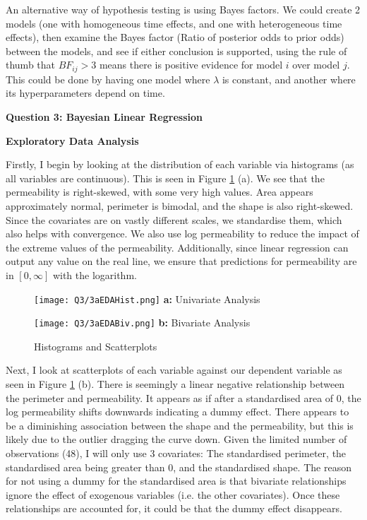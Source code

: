 \documentclass{article}
\begin{document}
An alternative way of hypothesis testing is using Bayes factors. We could create 2 models (one with homogeneous time effects, and one with heterogeneous time effects), then examine the Bayes factor (Ratio of posterior odds to prior odds) between the models, and see if either conclusion is supported, using the rule of thumb that $BF_{ij} > 3$ means there is positive evidence for model $i$ over model $j$.  This could be done by having one model where $\lambda$ is constant, and another where its hyperparameters depend on time. 

\newpage

\textbf{Question 3: Bayesian Linear Regression} \label{sec:3}

\textbf{Exploratory Data Analysis} \label{sec:3a}

Firstly, I begin by looking at the distribution of each variable via histograms (as all variables are continuous). This is seen in Figure \ref{Fig3a} (a). We see that the permeability is right-skewed, with some very high values. Area appears approximately normal, perimeter is bimodal, and the shape is also right-skewed. Since the covariates are on vastly different scales, we standardise them, which also helps with convergence. We also use log permeability to reduce the impact of the extreme values of the permeability. Additionally, since linear regression can output any value on the real line, we ensure that predictions for permeability are in $[0, \infty]$ with the logarithm. 

\begin{figure}[!h] 
    \begin{minipage}[l]{0.5\textwidth}
    \centering
    \texttt{[image: Q3/3aEDAHist.png]} 
    \scriptsize \textbf{a:} Univariate Analysis
    \end{minipage}
    \begin{minipage}[l]{0.5\textwidth}
    \centering
    \texttt{[image: Q3/3aEDABiv.png]}
    \scriptsize \textbf{b:} Bivariate Analysis
    \end{minipage}
\caption{Histograms and Scatterplots} \label{Fig3a}
\end{figure}


Next, I look at scatterplots of each variable against our dependent variable as seen in  Figure \ref{Fig3a} (b). There is seemingly a linear negative relationship between the perimeter and permeability. It appears as if after a standardised area of 0, the log permeability shifts downwards indicating a dummy effect. There appears to be a diminishing association between the shape and the permeability, but this is likely due to the outlier dragging the curve down. Given the limited number of observations (48), I will only use 3 covariates: The standardised perimeter, the standardised area being greater than 0, and the standardised shape. The reason for not using a dummy for the standardised area is that bivariate relationships ignore the effect of exogenous variables (i.e. the other covariates). Once these relationships are accounted for, it could be that the dummy effect disappears. 
\end{document}
